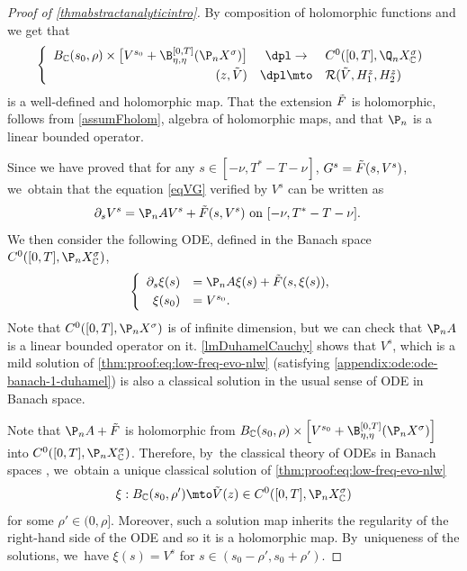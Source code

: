 \begin{proof}[Proof of \cref{thmabstractanalyticintro}]
By composition of holomorphic functions and \cite[Prop.\,8.10]{Muj86} we get that
\begin{align*}
\left\{\begin{array}{rcl}
B_{\mathbb{C}}(s_0, \rho)\times \bigl[V^{s_0}+\B_{\eta,\eta}^{[0,T]}(\P_n X^{\sigma})\bigr]&\dpl\to& C^0([0, T], \Q_n X_\mathbb{C}^\sigma)\\[3pt]
(z,\Tilde{V})&\dpl\mto& \mathcal{R}(\Tilde{V},H_{1}^z,H_{2}^z)
\end{array}\right.
\end{align*}
is a well-defined and holomorphic map. That the extension $\Tilde{F}$ is holomorphic, follows from \cref{assumFholom}, algebra of holomorphic maps, and that $\P_n$ is a linear bounded operator.

Since we have proved that for any $s\in [-\nu, T^*-T-\nu]$, $G^s=\Tilde{F}(s,V^s)$, we~obtain that the equation \eqref{eqVG} verified by $V^s$ can be written as
\begin{align*}
\partial_s V^s=\P_n AV^s+\Tilde{F}(s,V^s)& \textnormal{ on } [-\nu, T^*-T-\nu].
\end{align*}
We then consider the following ODE, defined in the Banach space $C^0([0, T], \P_n X_\mathbb{C}^\sigma)$,
\begin{align}\label{thm:proof:eq:low-freq-evo-nlw}
\left\{\begin{array}{rl}
\partial_s \xi(s)&=\P_nA\xi(s)+\Tilde{F}(s, \xi(s)), \\[3pt]
\xi(s_0)&=V^{s_0}.
\end{array}\right.
\end{align}
Note that $C^0([0,T], \P_n X^\sigma)$ is of infinite dimension, but we can check that $\P_n A$ is a linear bounded operator on it. \cref{lmDuhamelCauchy} shows that $V^s$, which is a mild solution of \eqref{thm:proof:eq:low-freq-evo-nlw} (\ie satisfying \eqref{appendix:ode:ode-banach-1-duhamel}) is also a classical solution in the usual sense of ODE in Banach space.

Note that $\P_n A+\Tilde{F}$ is holomorphic from $ B_{\mathbb{C}}(s_0, \rho)\times \left[V^{s_0}+ \B_{\eta,\eta}^{[0,T]}(\P_n X^{\sigma})\right]$ into $C^0([0, T], \P_n X_{\mathbb{C}}^\sigma)$. Therefore, by~the classical theory of ODEs in Banach spaces \cite[Th.\,10.4.5]{1969:dieudonne:modern-analysis}, we~obtain a unique classical solution of \eqref{thm:proof:eq:low-freq-evo-nlw}
\begin{align*}
\xi:B_{\mathbb{C}}(s_0, \rho')\mto \Tilde{V}(z)\in C^0([0,T], \P_n X_{\mathbb{C}}^\sigma)
\end{align*}
for some $\rho'\in (0, \rho]$. Moreover, such a solution map inherits the regularity of the right-hand side of the ODE and so it is a holomorphic map. By~uniqueness of the solutions, we~have $\xi(s)=V^s$ for $s\in (s_0-\rho',s_0+\rho')$.


\end{proof}
